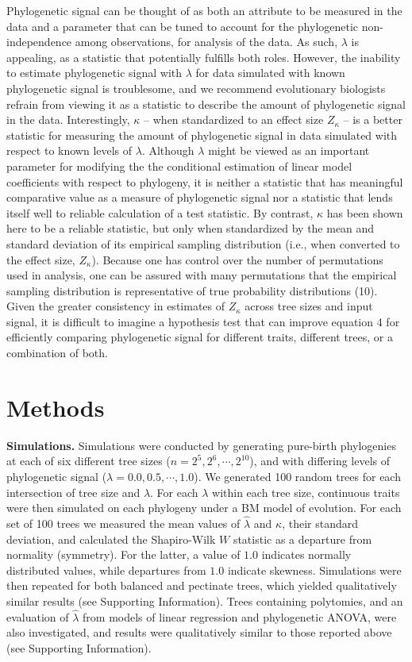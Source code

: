 \documentclass[9pt,twocolumn,twoside,lineno]{pnas-new}
\begin{document}
Phylogenetic signal can be thought of as both an attribute to be
measured in the data and a parameter that can be tuned to account for
the phylogenetic non-independence among observations, for analysis of
the data. As such, \(\lambda\) is appealing, as a statistic that
potentially fulfills both roles. However, the inability to estimate
phylogenetic signal with \(\lambda\) for data simulated with known
phylogenetic signal is troublesome, and we recommend evolutionary
biologists refrain from viewing it as a statistic to describe the amount
of phylogenetic signal in the data. Interestingly, \(\kappa\) -- when
standardized to an effect size \(Z_\kappa\) -- is a better statistic for
measuring the amount of phylogenetic signal in data simulated with
respect to known levels of \(\lambda\). Although \(\lambda\) might be
viewed as an important parameter for modifying the the conditional
estimation of linear model coefficients with respect to phylogeny, it is
neither a statistic that has meaningful comparative value as a measure
of phylogenetic signal nor a statistic that lends itself well to
reliable calculation of a test statistic. By contrast, \(\kappa\) has
been shown here to be a reliable statistic, but only when standardized
by the mean and standard deviation of its empirical sampling
distribution (i.e., when converted to the effect size, \(Z_\kappa\)).
Because one has control over the number of permutations used in
analysis, one can be assured with many permutations that the empirical
sampling distribution is representative of true probability
distributions (10). Given the greater consistency in estimates of
\(Z_\kappa\) across tree sizes and input signal, it is difficult to
imagine a hypothesis test that can improve equation 4 for efficiently
comparing phylogenetic signal for different traits, different trees, or
a combination of both.

\hypertarget{methods}{%
\section{Methods}\label{methods}}

\textbf{Simulations.} Simulations were conducted by generating
pure-birth phylogenies at each of six different tree sizes
(\(n=2^5, 2^6, \cdots, 2^{10}\)), and with differing levels of
phylogenetic signal (\(\lambda=0.0, 0.5, \cdots, 1.0\)). We generated
100 random trees for each intersection of tree size and \(\lambda\). For
each \(\lambda\) within each tree size, continuous traits were then
simulated on each phylogeny under a BM model of evolution. For each set
of 100 trees we measured the mean values of \(\hat{\lambda}\) and
\(\kappa\), their standard deviation, and calculated the Shapiro-Wilk
\(W\) statistic as a departure from normality (symmetry). For the
latter, a value of \(1.0\) indicates normally distributed values, while
departures from \(1.0\) indicate skewness. Simulations were then
repeated for both balanced and pectinate trees, which yielded
qualitatively similar results (see Supporting Information). Trees
containing polytomies, and an evaluation of \(\hat{\lambda}\) from
models of linear regression and phylogenetic ANOVA, were also
investigated, and results were qualitatively similar to those reported
above (see Supporting Information).
\end{document}
